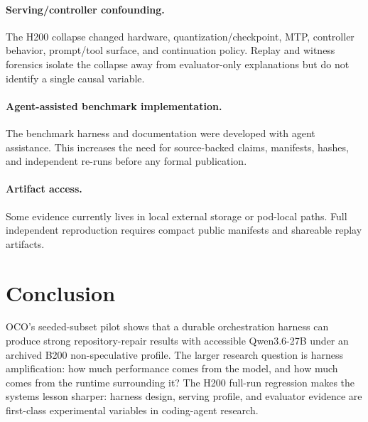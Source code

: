 \documentclass[11pt]{article}
\begin{document}
\paragraph{Serving/controller confounding.}
The H200 collapse changed hardware, quantization/checkpoint, MTP, controller behavior, prompt/tool surface, and continuation policy. Replay and witness forensics isolate the collapse away from evaluator-only explanations but do not identify a single causal variable.

\paragraph{Agent-assisted benchmark implementation.}
The benchmark harness and documentation were developed with agent assistance. This increases the need for source-backed claims, manifests, hashes, and independent re-runs before any formal publication.

\paragraph{Artifact access.}
Some evidence currently lives in local external storage or pod-local paths. Full independent reproduction requires compact public manifests and shareable replay artifacts.

\section{Conclusion}

OCO's seeded-subset pilot shows that a durable orchestration harness can produce strong repository-repair results with accessible Qwen3.6-27B under an archived B200 non-speculative profile. The larger research question is harness amplification: how much performance comes from the model, and how much comes from the runtime surrounding it? The H200 full-run regression makes the systems lesson sharper: harness design, serving profile, and evaluator evidence are first-class experimental variables in coding-agent research.



\end{document}
